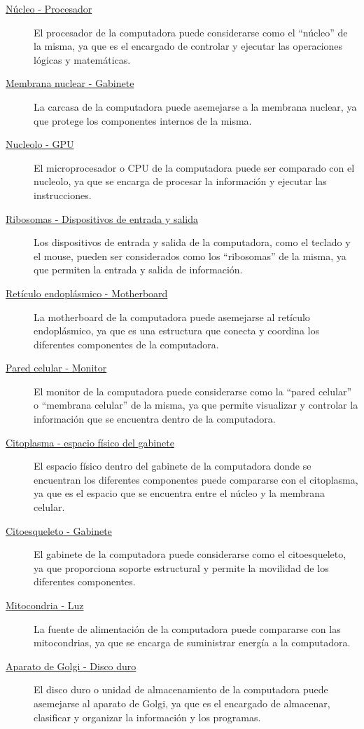\documentclass[
]{article}
\begin{document}
\begin{description}
\item[\uline{Núcleo - Procesador}]
El procesador de la computadora puede considerarse como el ``núcleo'' de
la misma, ya que es el encargado de controlar y ejecutar las operaciones
lógicas y matemáticas.
\item[\uline{Membrana nuclear - Gabinete}]
La carcasa de la computadora puede asemejarse a la membrana nuclear, ya
que protege los componentes internos de la misma.
\item[\uline{Nucleolo - GPU}]
El microprocesador o CPU de la computadora puede ser comparado con el
nucleolo, ya que se encarga de procesar la información y ejecutar las
instrucciones.
\item[\uline{Ribosomas - Dispositivos de entrada y salida}]
Los dispositivos de entrada y salida de la computadora, como el teclado
y el mouse, pueden ser considerados como los ``ribosomas'' de la misma,
ya que permiten la entrada y salida de información.
\item[\uline{Retículo endoplásmico - Motherboard}]
La motherboard de la computadora puede asemejarse al retículo
endoplásmico, ya que es una estructura que conecta y coordina los
diferentes componentes de la computadora.
\item[\uline{Pared celular - Monitor}]
El monitor de la computadora puede considerarse como la ``pared
celular'' o ``membrana celular'' de la misma, ya que permite visualizar
y controlar la información que se encuentra dentro de la computadora.
\item[\uline{Citoplasma - espacio físico del gabinete}]
El espacio físico dentro del gabinete de la computadora donde se
encuentran los diferentes componentes puede compararse con el
citoplasma, ya que es el espacio que se encuentra entre el núcleo y la
membrana celular.
\item[\uline{Citoesqueleto - Gabinete}]
El gabinete de la computadora puede considerarse como el citoesqueleto,
ya que proporciona soporte estructural y permite la movilidad de los
diferentes componentes.
\item[\uline{Mitocondria - Luz}]
La fuente de alimentación de la computadora puede compararse con las
mitocondrias, ya que se encarga de suministrar energía a la computadora.
\item[\uline{Aparato de Golgi - Disco duro}]
El disco duro o unidad de almacenamiento de la computadora puede
asemejarse al aparato de Golgi, ya que es el encargado de almacenar,
clasificar y organizar la información y los programas.
\end{description}
\end{document}
